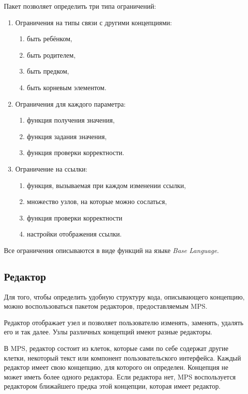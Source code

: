 		Пакет позволяет определить три типа ограничений:
		\begin{enumerate}
			\item Ограничения на типы связи с другими концепциями:
			\begin{enumerate}
				\item быть ребёнком,
				\item быть родителем,
				\item быть предком,
				\item быть корневым элементом.
			\end{enumerate}
			\item Ограничения для каждого параметра:
			\begin{enumerate}
				\item функция получения значения,
				\item функция задания значения,
				\item функция проверки корректности.
			\end{enumerate}
			\item Ограничение на ссылки:
			\begin{enumerate}
				\item функция, вызываемая при каждом изменении ссылки,
				\item множество узлов, на которые можно сослаться,
				\item функция проверки корректности
				\item настройки отображения ссылки.
			\end{enumerate}
		\end{enumerate}
	
		Все ограничения описываются в виде функций на языке \textit{Base Language}.
		
	\subsection{Редактор}
		Для того, чтобы определить удобную структуру кода, описывающего концепцию, можно воспользоваться пакетом редакторов, предоставляемым MPS.~\cite{mpssource}
		
		Редактор отображает узел и позволяет пользователю изменять, заменять, удалять его и так далее. Узлы различных концепций имеют разные редакторы. 
		
		В MPS, редактор состоит из клеток, которые сами по себе содержат другие клетки, некоторый текст или компонент пользовательского интерфейса. Каждый редактор имеет свою концепцию, для которого он определен. Концепция не может иметь более одного редактора. Если редактора нет, MPS воспользуется редактором ближайшего предка этой концепции, которая имеет редактор. 
		

